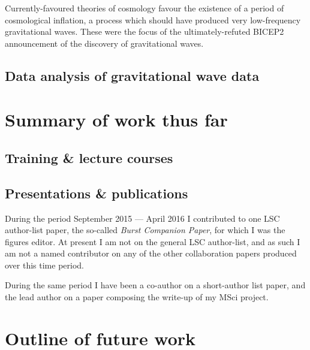 \documentclass{kentigern}
\begin{document}
Currently-favoured theories of cosmology favour the existence of a
period of cosmological inflation, a process which should have produced
very low-frequency gravitational waves.  These were the focus of the
ultimately-refuted BICEP2 announcement\cite{2014PhRvL.112x1101B} of
the discovery of gravitational waves.

\chapter{Data analysis of gravitational wave data}
\label{cha:data-analys-grav}


\part{Summary of work thus far}
\label{part:work}

\chapter{Training \& lecture courses}
\label{chap:lectures}

\chapter{Presentations \& publications}
\label{chap:pandp}

During the period September 2015 --- April 2016 I contributed to one
LSC author-list paper, the so-called \emph{Burst Companion Paper}, for
which I was the figures editor. At present I am not on the general LSC
author-list, and as such I am not a named contributor on any of the
other collaboration papers produced over this time period.

During the same period I have been a co-author on a short-author list
paper, and the lead author on a paper composing the write-up of my
MSci project.

\part{Outline of future work}
\label{part:future}






\glsaddall
\printglossaries
\end{document}
